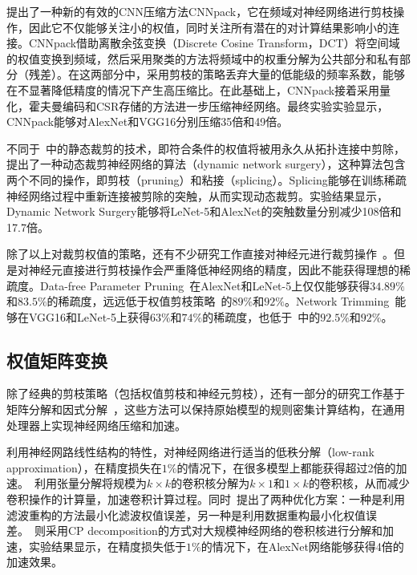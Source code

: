 \citet{wang2016cnnpack}提出了一种新的有效的CNN压缩方法CNNpack，它在频域对神经网络进行剪枝操作，因此它不仅能够关注小的权值，同时关注所有潜在的对计算结果影响小的连接。CNNpack借助离散余弦变换（Discrete Cosine Transform，DCT）将空间域的权值变换到频域，然后采用聚类的方法将频域中的权重分解为公共部分和私有部分（残差）。在这两部分中，采用剪枝的策略丢弃大量的低能级的频率系数，能够在不显著降低精度的情况下产生高压缩比。在此基础上，CNNpack接着采用量化，霍夫曼编码和CSR存储的方法进一步压缩神经网络。最终实验实验显示，CNNpack能够对AlexNet和VGG16分别压缩35倍和49倍。

不同于~\cite{han2015learning, han2015deep,wang2016cnnpack}中的静态裁剪的技术，即符合条件的权值将被用永久从拓扑连接中剪除，\citet{guo2016dynamic}提出了一种动态裁剪神经网络的算法（dynamic network surgery），这种算法包含两个不同的操作，即剪枝（pruning）和粘接（splicing）。Splicing能够在训练稀疏神经网络过程中重新连接被剪除的突触，从而实现动态裁剪。实验结果显示，Dynamic Network Surgery能够将LeNet-5和AlexNet的突触数量分别减少108倍和17.7倍。

除了以上对裁剪权值的策略，还有不少研究工作直接对神经元进行裁剪操作~\cite{he2014reshaping,srinivas2015data,hu2016network,mariet2015diversity}。但是对神经元直接进行剪枝操作会严重降低神经网络的精度，因此不能获得理想的稀疏度。Data-free Parameter Pruning~\cite{srinivas2015data}在AlexNet和LeNet-5上仅仅能够获得$34.89\%$和$83.5\%$的稀疏度，远远低于权值剪枝策略~\cite{han2015learning}的$89\%$和$92\%$。Network Trimming~\cite{hu2016network}能够在VGG16和LeNet-5上获得$63\%$和$74\%$的稀疏度，也低于~\cite{han2015learning}中的$92.5\%$和$92\%$。

\subsection{权值矩阵变换}
除了经典的剪枝策略（包括权值剪枝和神经元剪枝），还有一部分的研究工作基于矩阵分解和因式分解~\cite{denton2014exploiting,jaderberg2014speeding,lebedev2014speeding}，这些方法可以保持原始模型的规则密集计算结构，在通用处理器上实现神经网络压缩和加速。

\citet{denton2014exploiting}利用神经网路线性结构的特性，对神经网络进行适当的低秩分解（low-rank approximation），在精度损失在$1\%$的情况下，在很多模型上都能获得超过2倍的加速。~\citet{jaderberg2014speeding}利用张量分解将规模为$k\times k$的卷积核分解为$k\times 1$和$1\times k$的卷积核，从而减少卷积操作的计算量，加速卷积计算过程。同时~\cite{jaderberg2014speeding}提出了两种优化方案：一种是利用滤波重构的方法最小化滤波权值误差，另一种是利用数据重构最小化权值误差。~\citet{lebedev2014speeding}则采用CP decomposition的方式对大规模神经网络的卷积核进行分解和加速，实验结果显示，在精度损失低于$1\%$的情况下，在AlexNet网络能够获得4倍的加速效果。



